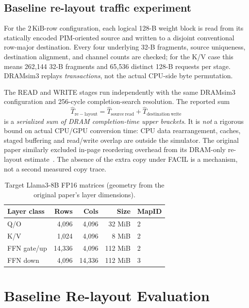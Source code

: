 \documentclass[conference,10pt]{IEEEtran}
\newcommand{\facil}{FACIL}
\newcommand{\KiB}{\,\mathrm{KiB}}
\begin{document}
\subsection{Baseline re-layout traffic experiment}
For the $2\KiB$-row configuration, each logical 128-B weight block
is read from its statically encoded PIM-oriented source and written
to a disjoint conventional row-major destination. Every
four underlying 32-B fragments, source uniqueness, destination
alignment, and channel counts are checked; for the K/V case this
means 262,144 32-B fragments and 65,536 distinct 128-B requests
per stage. DRAMsim3 replays \emph{transactions}, not the actual
CPU-side byte permutation.

The READ and WRITE stages run independently with the same
DRAMsim3 configuration and 256-cycle completion-search resolution. The reported sum
\begin{equation}
\widehat{T}_{\mathrm{re-layout}}=
\widehat{T}_{\mathrm{source\ read}}+
\widehat{T}_{\mathrm{destination\ write}}
\label{eq:copy}
\end{equation}
is a \emph{serialized sum of DRAM completion-time upper brackets}.
It is \emph{not} a rigorous bound on actual CPU/GPU conversion time:
CPU data rearrangement, caches, staged buffering and read/write
overlap are outside the simulator. The original paper similarly
excluded in-page reordering overhead from its DRAM-only
re-layout estimate~\cite{facil}. The absence of the extra copy
under \facil{} is a mechanism, not a second measured copy trace.

\begin{table}[t]
\caption{Target Llama3-8B FP16 matrices (geometry from the original paper's layer dimensions).}
\label{tab:layers}
\centering\footnotesize
\begin{tabular}{@{}lrrrl@{}}
\toprule
Layer class & Rows & Cols & Size & MapID \\
\midrule
Q/O & 4,096 & 4,096 & 32 MiB & 2 \\
K/V & 1,024 & 4,096 & 8 MiB & 2 \\
FFN gate/up & 14,336 & 4,096 & 112 MiB & 2 \\
FFN down & 4,096 & 14,336 & 112 MiB & 3 \\
\bottomrule
\end{tabular}
\end{table}

\section{Baseline Re-layout Evaluation}
\end{document}
